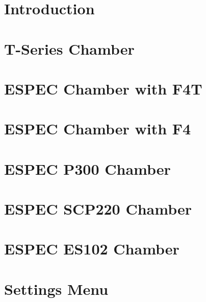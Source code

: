 \documentclass[11pt,twoside,openany]{book}
\begin{document}
%
%
\cleardoublepage 
\tableofcontents              %
\cleardoublepage              %
%
%
\part{Introduction}


\part{T-Series Chamber}


\part{ESPEC Chamber with F4T} 
 

\part{ESPEC Chamber with F4}
 

\part{ESPEC P300 Chamber} 
 

\part{ESPEC SCP220 Chamber}
 

\part{ESPEC ES102 Chamber}
 

\part{Settings Menu} 


 

\end{document}
